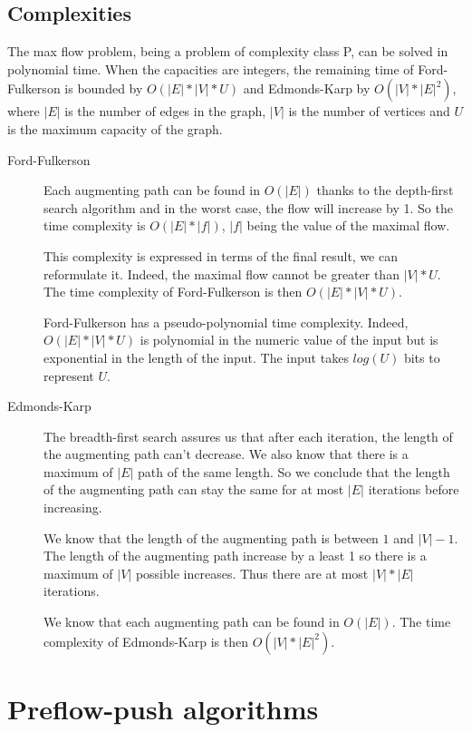 \subsection{Complexities}
The max flow problem, being a problem of complexity class P, can be solved in polynomial time. When the capacities are integers, the remaining time of Ford-Fulkerson is bounded by $O(|E|*|V|*U)$ and Edmonds-Karp by $O(|V|*|E|^2)$, where $|E|$ is the number of edges in the graph, $|V|$ is the number of vertices and $U$ is the maximum capacity of the graph.

\begin{description}
\item[Ford-Fulkerson]{Each augmenting path can be found in $O(|E|)$ thanks to the depth-first search algorithm and in the worst case, the flow will increase by 1. So the time complexity is $O(|E|*|f|)$, $|f|$ being the value of the maximal flow. 

This complexity is expressed in terms of the final result, we can reformulate it. Indeed, the maximal flow cannot be greater than $|V|*U$. The time complexity of Ford-Fulkerson is then $O(|E|*|V|*U)$.

Ford-Fulkerson has a pseudo-polynomial time complexity. Indeed, $O(|E|*|V|*U)$ is polynomial in the numeric value of the input but is exponential in the length of the input. The input takes $log(U)$ bits to represent $U$.}

\item[Edmonds-Karp]{The breadth-first search assures us that after each iteration, the length of the augmenting path can't decrease. We also know that there is a maximum of $|E|$ path of the same length. So we conclude that the length of the augmenting path can stay the same for at most $|E|$ iterations before increasing. 

We know that the length of the augmenting path is between $1$ and $|V|-1$. The length of the augmenting path increase by a least 1 so there is a maximum of $|V|$ possible increases. Thus there are at most $|V|*|E|$ iterations.

We know that each augmenting path can be found in $O(|E|)$. The time complexity of Edmonds-Karp is then $O(|V|*|E|^2)$.}
\end{description}



\section{Preflow-push algorithms}
\label{sec:preflow}

